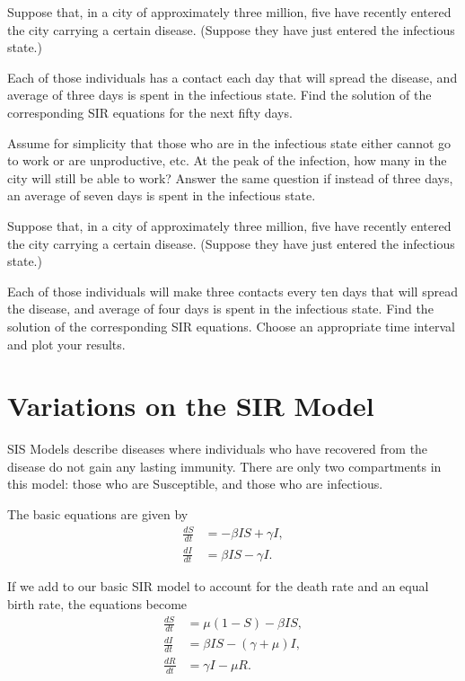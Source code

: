 \begin{problem}
Suppose that, in a city of approximately three million, five have recently entered the city carrying a certain disease. (Suppose they have just entered the infectious state.)

Each of those individuals has a contact each day that will spread the disease, and average of three days is spent in the infectious state. Find the solution of the corresponding SIR equations for the next fifty days. 

Assume for simplicity that those who are in the infectious state either cannot go to work or are unproductive, etc. At the peak of the infection, how many in the city will still be able to work? 
Answer the same question if instead of three days, an average of seven days is spent in the infectious state.
\end{problem}


\begin{problem}
Suppose that, in a city of approximately three million, five have recently entered the city carrying a certain disease. (Suppose they have just entered the infectious state.) 

Each of those individuals will make three contacts every ten days that will spread the disease, and average of four days is spent in the infectious state. Find the solution of the corresponding SIR equations. Choose an appropriate time interval and plot your results.
\end{problem}


\section*{Variations on the SIR Model}


SIS Models describe diseases where individuals who have recovered from the disease do not gain 
any lasting immunity. There are only two compartments in this model: those who are Susceptible, and 
those who are infectious.

The basic equations are given by 
\begin{align*}
\frac{dS}{dt} &=-\beta I S + \gamma I ,\\
\frac{dI}{dt} &= \beta I S-\gamma I.
\end{align*}


If we add to our basic SIR model to account for the death rate and an equal birth rate, the equations become
\begin{align*}
\frac{dS}{dt} &=\mu(1 -S) - \beta I S,\\
\frac{dI}{dt} &= \beta I S - (\gamma + \mu)I, \\
\frac{dR}{dt} &= \gamma I - \mu R.
\end{align*}

